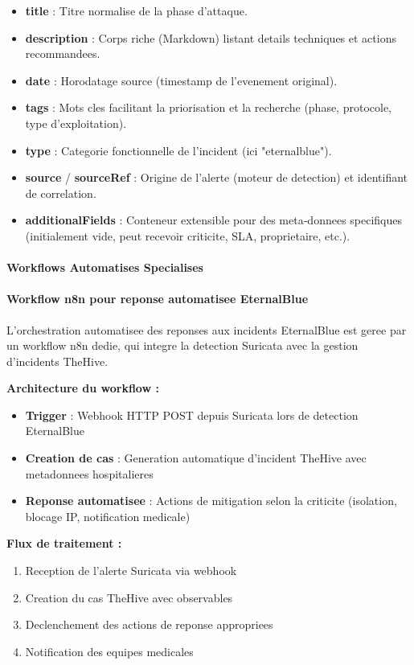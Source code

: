 \begin{itemize}
    \item \textbf{title} : Titre normalise de la phase d'attaque.
    \item \textbf{description} : Corps riche (Markdown) listant details techniques et actions recommandees.
    \item \textbf{date} : Horodatage source (timestamp de l'evenement original).
    \item \textbf{tags} : Mots cles facilitant la priorisation et la recherche (phase, protocole, type d'exploitation).
    \item \textbf{type} : Categorie fonctionnelle de l'incident (ici "eternalblue").
    \item \textbf{source} / \textbf{sourceRef} : Origine de l'alerte (moteur de detection) et identifiant de correlation.
    \item \textbf{additionalFields} : Conteneur extensible pour des meta‑donnees specifiques (initialement vide, peut recevoir criticite, SLA, proprietaire, etc.).
\end{itemize}

\paragraph{Workflows Automatises Specialises}

\paragraph{Workflow n8n pour reponse automatisee EternalBlue}

L'orchestration automatisee des reponses aux incidents EternalBlue est geree par un workflow n8n dedie, qui integre la detection Suricata avec la gestion d'incidents TheHive.


\textbf{Architecture du workflow :}
\begin{itemize}
    \item \textbf{Trigger} : Webhook HTTP POST depuis Suricata lors de detection EternalBlue
    \item \textbf{Creation de cas} : Generation automatique d'incident TheHive avec metadonnees hospitalieres
    \item \textbf{Reponse automatisee} : Actions de mitigation selon la criticite (isolation, blocage IP, notification medicale)
\end{itemize}

\textbf{Flux de traitement :}
\begin{enumerate}
    \item Reception de l'alerte Suricata via webhook
    \item Creation du cas TheHive avec observables
    \item Declenchement des actions de reponse appropriees
    \item Notification des equipes medicales
\end{enumerate}


